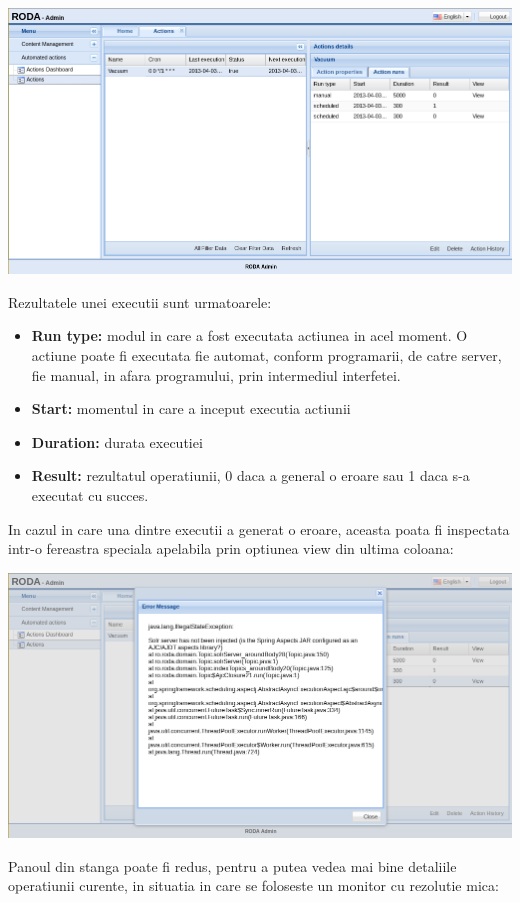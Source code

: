 \includegraphics[width=\textwidth]{actionsview-runs}

Rezultatele unei executii sunt urmatoarele: 
\begin{itemize}
\item \textbf{Run type:} modul in care a fost executata actiunea in acel
moment. O actiune poate fi executata fie automat, conform programarii,
de catre server, fie manual, in afara programului, prin intermediul
interfetei. 
\item \textbf{Start:} momentul in care a inceput executia actiunii 
\item \textbf{Duration:} durata executiei 
\item \textbf{Result:} rezultatul operatiunii, 0 daca a general o eroare
sau 1 daca s-a executat cu succes. 
\end{itemize}
In cazul in care una dintre executii a generat o eroare, aceasta poata
fi inspectata intr-o fereastra speciala apelabila prin optiunea view
din ultima coloana: 

\includegraphics[width=\textwidth]{actionsview-errorview}

Panoul din stanga poate fi redus, pentru a putea vedea mai bine detaliile
operatiunii curente, in situatia in care se foloseste un monitor cu
rezolutie mica: 

